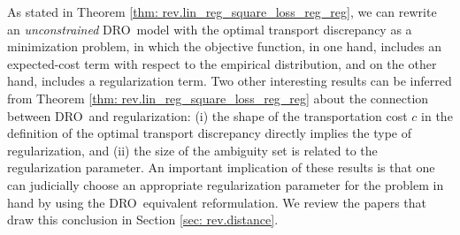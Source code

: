 \documentclass[final,onefignum,onetabnum]{class}
\newcommand{\ee}[2]{\mathbb{E}_{#1} \left[ #2 \right]}
\newcommand{\bs}[1]{\boldsymbol{#1}} %
\newcommand{\Bs}[1]{\mathbb{#1}} %
\newcommand{\Ts}[1]{\mathbbmtt{#1}} %
\newcommand{\Cs}[1]{\mathcal{#1}} %
\newcommand{\txi}{\tilde{\bs{\xi}}}
\newcommand{\nomP}{\Ts{P}_{0}}
\newcommand{\dro}{DRO}
\begin{document}
\begin{comment}
\begin{theorem}{\citet[Theorem~3]{blanchet2016robust}}
    \label{thm: rev.reg_reg}
    Consider a given set of data $\{\bs{\xi}^{i}:=(\bs{u}^{i},y^{i})\}_{i=1}^{N}$, where $\bs{u}^{i} \in \Bs{R}^{n}$ is a vector of covariates and $y^{i} \in \Bs{R}$ is the response variable.  Suppose that $\nomP$ is the empirical probability distribution on $\{\bs{\xi}^{i}\}_{i=1}^{k}$, $c(\bs{\xi}^{1},\bs{\xi}^{2}):=\| \bs{u}^{1} - \bs{u}^{2} \|_{q}^{2}$ if $y^{1}=y^{2}$, and  $c(\bs{\xi}^{1},\bs{\xi}^{2})=\infty$, otherwise. Furthermore, suppose that $h_{1}(\bs{x}, \bs{\xi}):=\log(1+e^{-y\bs{x}^{\top}\bs{u} })$ for a logistic regression model and $h_{2}(\bs{x}, \bs{\xi}):=(1-y\bs{x}^{\top}\bs{u})_{+} $ for a SVM with Hinge loss. 
    Then, we have 
    $$\inf_{\bs{x} \in \Bs{R}^{n} } \ \sup_{\Ts{P} \in \Cs{P}^{\text{W}}(\epsilon) } \ 	\ee{\Ts{P}}{h_{1}(\bs{x},\txi)} = \inf_{\bs{x} \in \Bs{R}^{n}}  \ \left\lbrace  \epsilon \| \bs{x} \|_{p} +  \ee{\nomP}{h_{1}(\bs{x},\txi)}  \right\rbrace,$$
    and 
    $$\inf_{\bs{x} \in \Bs{R}^{n} } \ \sup_{\Ts{P} \in \Cs{P}^{\text{W}}(\epsilon) } \ 	\ee{\Ts{P}}{h_{2}(\bs{x},\txi)} = \inf_{\bs{x} \in \Bs{R}^{n}}  \ \left\lbrace  \epsilon \| \bs{x} \|_{p} +  \ee{\nomP}{h_{2}(\bs{x},\txi)}  \right\rbrace,$$
    where $\frac{1}{p}+\frac{1}{q}=1$. 
\end{theorem}
\end{comment}



As stated in Theorem \ref{thm: rev.lin_reg_square_loss_reg_reg}, we can rewrite an {\it unconstrained} \dro\ model with the optimal transport discrepancy as a minimization problem, in which the objective function, in one hand, includes an expected-cost term with respect to the empirical distribution, and on the other hand, includes a regularization term. Two other interesting results  can be inferred from Theorem \ref{thm: rev.lin_reg_square_loss_reg_reg}  about the connection between \dro\ and regularization: (i) the shape of the transportation cost $c$ in the definition of the optimal transport discrepancy directly implies the type of  regularization, and (ii) the size of the ambiguity set is related to the regularization parameter. An important implication of these results is that one can judicially choose an appropriate regularization parameter for the problem in hand by using the \dro\ equivalent reformulation.  
We review the papers that draw this conclusion in Section \ref{sec: rev.distance}. 
\end{document}
